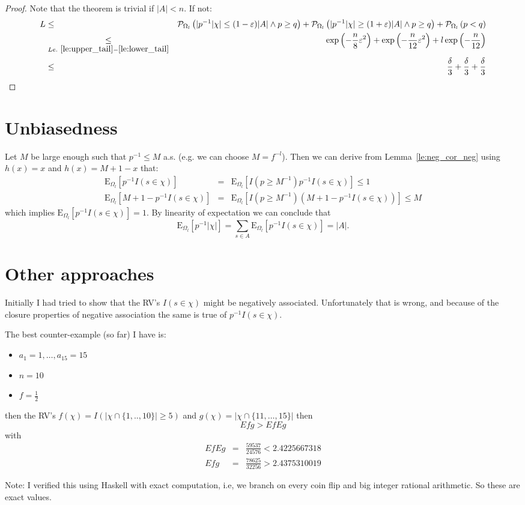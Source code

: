 \documentclass{article}
\newcommand{\prob}{\mathcal P}
\newcommand{\expectation}{\mathrm{E}}
\newcommand{\eps}{\varepsilon}
\theoremstyle{definition}
\begin{document}
\begin{proof}
Note that the theorem is trivial if $|A| < n$. If not:
\begin{eqnarray*}
  L & \leq & \prob_{\Omega_l} \left( | p^{-1} |\chi| \leq (1-\eps) |A| \wedge p \geq q \right) +
    \prob_{\Omega_l} \left( | p^{-1} |\chi| \geq (1+\eps) |A| \wedge p \geq q \right) +
    \prob_{\Omega_l} \left( p < q \right) \\
    & \underset{Le.~\ref{le:upper_tail}-\ref{le:lower_tail}}{\leq} &
    \exp\left( - \frac{n}{8} \eps^2 \right)  + \exp\left( - \frac{n}{12} \eps^2 \right) + l \exp\left( - \frac{n}{12} \right) \\
    & \leq & \frac{\delta}{3} + \frac{\delta}{3} + \frac{\delta}{3}
\end{eqnarray*}
\end{proof}

\section{Unbiasedness}
Let $M$ be large enough such that $p^{-1} \leq M$ a.s. (e.g. we can choose $M = f^{-l}$). Then we can derive from Lemma~\ref{le:neg_cor_neg} using $h(x) = x$ and $h(x) = M+1-x$ that:
\begin{eqnarray*}
  \expectation_{\Omega_l} [ p^{-1} I(s \in \chi) ] & = & \expectation_{\Omega_l} [ I(p \geq M^{-1}) p^{-1} I(s \in \chi) ] \leq 1 \\
  \expectation_{\Omega_l} [ M + 1 - p^{-1} I(s \in \chi) ] & = & \expectation_{\Omega_l} [ I(p \geq M^{-1}) (M + 1 - p^{-1} I(s \in \chi)) ] \leq M  
\end{eqnarray*}
which implies $\expectation_{\Omega_l} [ p^{-1} I(s \in \chi) ] = 1$.
By linearity of expectation we can conclude that
\[
  \expectation_{\Omega_l} [ p^{-1} |\chi| ] = \sum_{s \in A} \expectation_{\Omega_l} [ p^{-1} I(s \in \chi) ] = |A| \textrm{.}
\]

\section{Other approaches}
Initially I had tried to show that the RV's $I(s \in \chi)$ might be negatively associated. Unfortunately that is wrong, and because of the closure properties of
negative association the same is true of $p^{-1} I(s \in \chi)$.

The best counter-example (so far) I have is: 
\begin{itemize}
\item $a_1 = 1, \ldots, a_{15} = 15$ 
\item $n = 10$
\item $f = \frac{1}{2}$
\end{itemize}
then the RV's $f(\chi) = I(|\chi \cap \{1,..,10\}| \geq 5)$ and $g(\chi) = |\chi \cap \{11,\ldots,15\}|$ then 
\[
  E f g > E f E g
\]
with
\begin{eqnarray*}
  E f E g & = & \frac{59537}{24576} < 2.4225667318 \\
  E f g & = & \frac{78625}{32256} > 2.4375310019 
\end{eqnarray*}

Note: I verified this using Haskell with exact computation, i.e, we branch on every coin flip and big integer rational arithmetic. So these are exact values.



 
\end{document}
